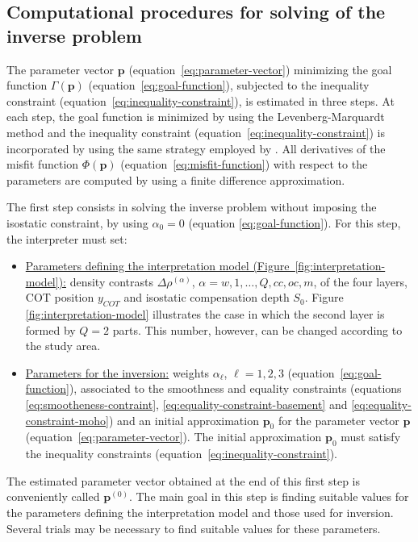 \documentclass[manuscript]{geophysics}
\begin{document}
\subsection{Computational procedures for solving of the inverse problem}

The parameter vector $\mathbf{p}$ (equation~\ref{eq:parameter-vector}) minimizing the
goal function $\Gamma (\mathbf{p})$ (equation~\ref{eq:goal-function}), subjected to
the inequality constraint (equation~\ref{eq:inequality-constraint}), is estimated 
in three steps. At each step, the goal function is minimized by using the Levenberg-Marquardt 
method \citep{aster-etal2005} and the inequality constraint 
(equation~\ref{eq:inequality-constraint}) is incorporated by using the same strategy 
employed by \citet{barbosa-etal1999}.
All derivatives of the misfit function $\Phi(\mathbf{p})$ (equation~\ref{eq:misfit-function})
with respect to the parameters are computed by using a finite difference approximation.

The first step consists in solving the inverse problem without imposing the isostatic
constraint, by using $\alpha_{0} = 0$ (equation \ref{eq:goal-function}). For this step,
the interpreter must set:
\begin{itemize}
	\item \underline{Parameters defining the interpretation model
	(Figure~\ref{fig:interpretation-model}):} density contrasts $\Delta \rho^{(\alpha)}$, 
	$\alpha = w, 1, \dots, Q, cc, oc, m$, of the four layers, COT position $y_{COT}$ and
	isostatic compensation depth $S_{0}$. Figure \ref{fig:interpretation-model} illustrates 
	the case in which the second layer is formed by $Q = 2$ parts. This number, however, 
	can be changed according to the study area.
	\item \underline{Parameters for the inversion:} weights $\alpha_{\ell}$,
	$\ell = 1, 2, 3$ (equation~\ref{eq:goal-function}), associated to the 
	smoothness and equality constraints (equations \ref{eq:smootheness-contraint},
	\ref{eq:equality-constraint-basement} and \ref{eq:equality-constraint-moho})
	and an initial approximation $\mathbf{p}_{0}$ for the parameter vector $\mathbf{p}$
	(equation~\ref{eq:parameter-vector}). The initial approximation $\mathbf{p}_{0}$
	must satisfy the inequality constraints (equation~\ref{eq:inequality-constraint}).
\end{itemize}
The estimated parameter vector obtained at the end of this first step is conveniently called
$\mathbf{p}^{(0)}$. The main goal in this step is finding suitable values for the parameters
defining the interpretation model and those used for inversion. Several trials may be
necessary to find suitable values for these parameters. 
\end{document}
